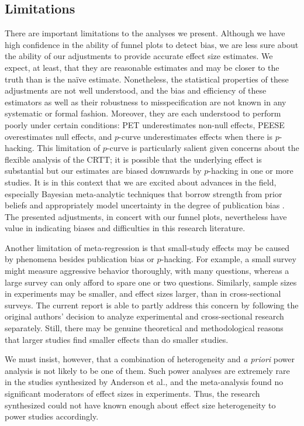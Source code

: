 \documentclass[man, mask]{apa6}
\begin{document}
\subsection{Limitations}
There are important limitations to the analyses we present.  Although we have high confidence in the ability of funnel plots to detect bias, we are less sure about the ability of our adjustments to provide accurate effect size estimates.  We expect, at least, that they are reasonable estimates and may be closer to the truth than is the na{\"i}ve estimate.  Nonetheless, the statistical properties of these adjustments are not well understood, and the bias and efficiency of these estimators as well as their robustness to misspecification are not known in any systematic or formal fashion.  Moreover, they are each understood to perform poorly under certain conditions: PET underestimates non-null effects, PEESE overestimates null effects, and $p$-curve underestimates effects when there is $p$-hacking. This limitation of $p$-curve is particularly salient given concerns about the flexible analysis of the CRTT; it is possible that the underlying effect is substantial but our estimates are biased downwards by $p$-hacking in one or more studies.  %
It is in this context that we are excited about advances in the field, especially Bayesian meta-analytic techniques that borrow strength from prior beliefs and appropriately model uncertainty in the degree of publication bias \citep{Guan:Vandekerckhove:2015}. The presented adjustments, in concert with our funnel plots, nevertheless have value in indicating biases and difficulties in this research literature. 

Another limitation of meta-regression is that small-study effects may be caused by phenomena besides publication bias or $p$-hacking. For example, a small survey might measure aggressive behavior thoroughly, with many questions, whereas a large survey can only afford to spare one or two questions. Similarly, sample sizes in experiments may be smaller, and effect sizes larger, than in cross-sectional surveys. The current report is able to partly address this concern by following the original authors' decision to analyze experimental and cross-sectional research separately. Still, there may be genuine theoretical and methodological reasons that larger studies find smaller effects than do smaller studies. 

We must insist, however, that a combination of heterogeneity and {\em a priori} power analysis is not likely to be one of them. Such power analyses are extremely rare in the studies synthesized by Anderson et al., and the meta-analysis found no significant moderators of effect sizes in experiments. Thus, the research synthesized could not have known enough about effect size heterogeneity to power studies accordingly.  
\end{document}
